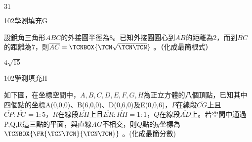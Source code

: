 \begin{QUESTIONS}
\begin{QUESTION}
\begin{QBODY}
        \end{QBODY}
        \begin{QFROMS}
        \end{QFROMS}
        \begin{QTAGS}\end{QTAGS}
        \begin{QANS}
            $31$
        \end{QANS}
        \begin{QSOLLIST}
        \end{QSOLLIST}
        \begin{QEMPTYSPACE}
        \end{QEMPTYSPACE}
    \end{QUESTION}
    \begin{QUESTION}
        \begin{ExamInfo}{102}{學測}{填充}{G}
        \end{ExamInfo}
        \begin{ExamAnsRateInfo}{19}{46}{10}{1}
        \end{ExamAnsRateInfo}
        \begin{QBODY}
            設銳角三角形$ABC$的外接圓半徑為8。已知外接圓圓心到$\overline{AB}$的距離為2，而到$\overline{BC}$的距離為7，則$\overline{AC}=\TCNBOX{\TCN\sqrt{\TCN\TCN}}$ 。（化成最簡根式）
        \end{QBODY}
        \begin{QFROMS}
        \end{QFROMS}
        \begin{QTAGS}\end{QTAGS}
        \begin{QANS}
            $4\sqrt{15}$
        \end{QANS}
        \begin{QSOLLIST}
        \end{QSOLLIST}
        \begin{QEMPTYSPACE}
        \end{QEMPTYSPACE}
    \end{QUESTION}
    \begin{QUESTION}
        \begin{ExamInfo}{102}{學測}{填充}{H}
        \end{ExamInfo}
        \begin{ExamAnsRateInfo}{18}{48}{6}{0}
        \end{ExamAnsRateInfo}
        \begin{QBODY}
            如下圖，在坐標空間中，$A,B,C,D,E,F,G,H$為正立方體的八個頂點，已知其中四個點的坐標A(0,0,0)、B(6,0,0)、D(0,6,0)及E(0,0,6)，$P$在線段$\overline{CG}$上且$\overline{CP}:\overline{PG}=1:5$，$R$在線段$\overline{EH}$上且$\overline{ER}:\overline{RH}=1:1$，$Q$在線段$\overline{AD}$上。若空間中通過P,Q,R這三點的平面，與直線$AG$不相交，則$Q$點的$y$坐標為$\TCNBOX{\FR{\TCN\TCN}{\TCN\TCN}}$ 。(化成最簡分數) 
			

\end{QBODY}
\end{QUESTION}
\end{QUESTIONS}
